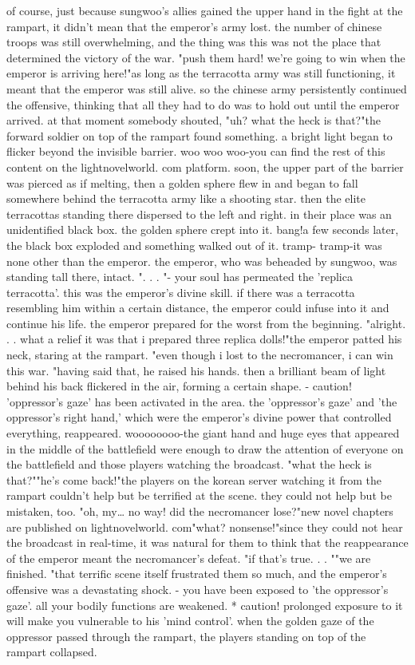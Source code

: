 of course, just because sungwoo's allies gained the upper hand in the fight at the rampart, it didn't mean that the emperor's army lost.
 the number of chinese troops was still overwhelming, and the thing was this was not the place that determined the victory of the war.
 "push them hard! we're going to win when the emperor is arriving here!"as long as the terracotta army was still functioning, it meant that the emperor was still alive.
 so the chinese army persistently continued the offensive, thinking that all they had to do was to hold out until the emperor arrived.
at that moment somebody shouted, "uh? what the heck is that?"the forward soldier on top of the rampart found something.
 a bright light began to flicker beyond the invisible barrier.
woo woo woo-you can find the rest of this content on the lightnov­elworld.
com platform.
soon, the upper part of the barrier was pierced as if melting, then a golden sphere flew in and began to fall somewhere behind the terracotta army like a shooting star.
then the elite terracottas standing there dispersed to the left and right.
 in their place was an unidentified black box.
 the golden sphere crept into it.
bang!a few seconds later, the black box exploded and something walked out of it.
tramp- tramp-it was none other than the emperor.
 the emperor, who was beheaded by sungwoo, was standing tall there, intact.
".
.
.
"- your soul has permeated the 'replica terracotta'.
this was the emperor's divine skill.
 if there was a terracotta resembling him within a certain distance, the emperor could infuse into it and continue his life.
the emperor prepared for the worst from the beginning.
"alright.
.
.
what a relief it was that i prepared three replica dolls!"the emperor patted his neck, staring at the rampart.
 "even though i lost to the necromancer, i can win this war.
"having said that, he raised his hands.
 then a brilliant beam of light behind his back flickered in the air, forming a certain shape.
 - caution! 'oppressor's gaze' has been activated in the area.
the 'oppressor's gaze' and 'the oppressor's right hand,' which were the emperor's divine power that controlled everything, reappeared.
woooooooo-the giant hand and huge eyes that appeared in the middle of the battlefield were enough to draw the attention of everyone on the battlefield and those players watching the broadcast.
"what the heck is that?""he's come back!"the players on the korean server watching it from the rampart couldn't help but be terrified at the scene.
 they could not help but be mistaken, too.
 "oh, my… no way! did the necromancer lose?"new novel chapters are published on lightnovelworld.
com"what? nonsense!"since they could not hear the broadcast in real-time, it was natural for them to think that the reappearance of the emperor meant the necromancer's defeat.
"if that's true.
.
.
""we are finished.
"that terrific scene itself frustrated them so much, and the emperor's offensive was a devastating shock.
 - you have been exposed to 'the oppressor's gaze'.
 all your bodily functions are weakened.
 * caution! prolonged exposure to it will make you vulnerable to his 'mind control'.
when the golden gaze of the oppressor passed through the rampart, the players standing on top of the rampart collapsed.


